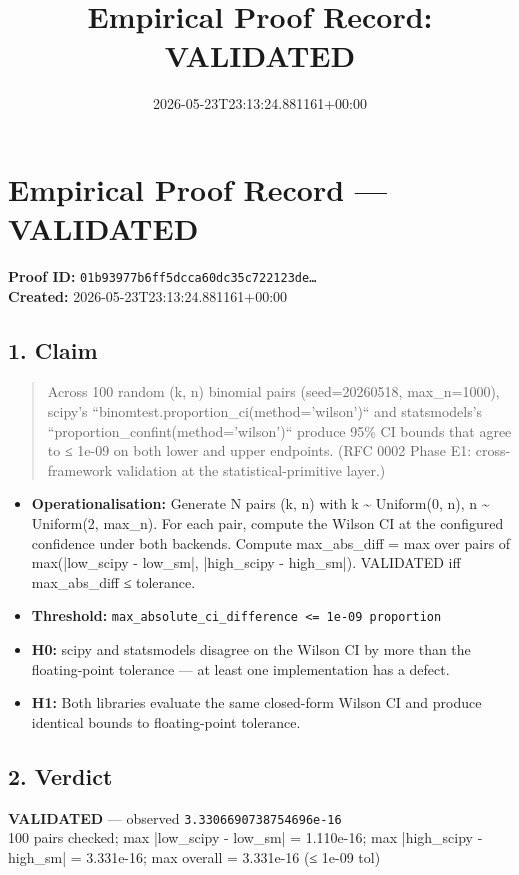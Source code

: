 \documentclass{article}
\title{Empirical Proof Record: VALIDATED}
\date{2026-05-23T23:13:24.881161+00:00}
\begin{document}
\maketitle
\section*{Empirical Proof Record --- \textcolor{validated}{\textbf{VALIDATED}}}
\textbf{Proof ID:} \texttt{01b93977b6ff5dcca60dc35c722123de\dots}\\
\textbf{Created:} 2026-05-23T23:13:24.881161+00:00
\subsection*{1. Claim}
\begin{quote}Across 100 random (k, n) binomial pairs (seed=20260518, max\_n=1000), scipy's ``binomtest.proportion\_ci(method='wilson')`` and statsmodels's ``proportion\_confint(method='wilson')`` produce 95\% CI bounds that agree to ≤ 1e-09 on both lower and upper endpoints. (RFC 0002 Phase E1: cross-framework validation at the statistical-primitive layer.)\end{quote}
\begin{itemize}
\item \textbf{Operationalisation:} Generate N pairs (k, n) with k \textasciitilde{} Uniform(0, n), n \textasciitilde{} Uniform(2, max\_n). For each pair, compute the Wilson CI at the configured confidence under both backends. Compute max\_abs\_diff = max over pairs of max(|low\_scipy - low\_sm|, |high\_scipy - high\_sm|). VALIDATED iff max\_abs\_diff ≤ tolerance.
\item \textbf{Threshold:} \texttt{max\_absolute\_ci\_difference <= 1e-09 proportion}
\item \textbf{H0:} scipy and statsmodels disagree on the Wilson CI by more than the floating-point tolerance — at least one implementation has a defect.
\item \textbf{H1:} Both libraries evaluate the same closed-form Wilson CI and produce identical bounds to floating-point tolerance.
\end{itemize}
\subsection*{2. Verdict}
\textcolor{validated}{\textbf{VALIDATED}} --- observed \texttt{3.3306690738754696e-16}\\
100 pairs checked; max |low\_scipy - low\_sm| = 1.110e-16; max |high\_scipy - high\_sm| = 3.331e-16; max overall = 3.331e-16 (≤ 1e-09 tol)
\end{document}
